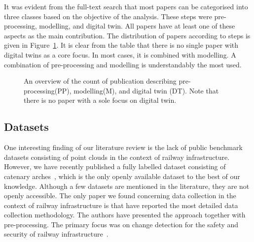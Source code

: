 It was evident from the full-text search that most papers can be categorised into three classes based on the objective of the analysis. These steps were pre-processing, modelling, and digital twin. All papers have at least one of these aspects as the main contribution. The distribution of papers according to steps is given in Figure~\ref{fig:stoa:steps}. It is clear from the table that there is no single paper with digital twins as a core focus. In most cases, it is combined with modelling. A combination of pre-processing and modelling is understandably the most used.
\begin{figure}
    \centering
    \caption{An overview of the count of publication describing pre-processing(PP), modelling(M), and digital twin (DT). Note that there is no paper with a sole focus on digital twin.}
    \label{fig:stoa:steps}
\end{figure}


\subsection{Datasets} 
One interesting finding of our literature review is the lack of public benchmark datasets consisting of point clouds in the context of railway infrastructure. However, we have recently published a fully labelled dataset consisting of catenary arches~\cite{ton2022semantic}, which is the only openly available dataset to the best of our knowledge. Although a few datasets are mentioned in the literature, they are not openly accessible. 
The only paper we found concerning data collection in the context of railway infrastructure is \cite{sturari2017robotic} that have reported the most detailed data collection methodology. The authors have presented the approach together with pre-processing. The primary focus was on change detection for the safety and security of railway infrastructure~\cite{sturari2017robotic}. 

